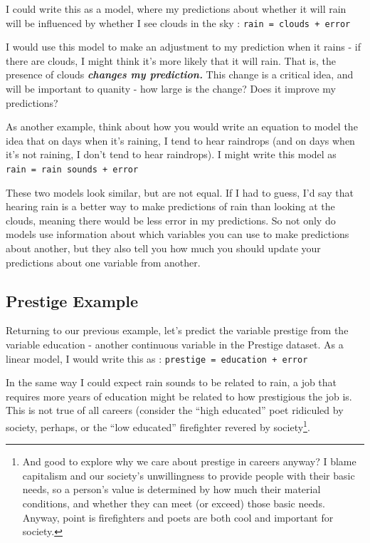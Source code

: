 \documentclass[
  letterpaper,
  DIV=11,
  numbers=noendperiod,
  oneside]{scrreprt}
\begin{document}
I could write this as a model, where my predictions about whether it
will rain will be influenced by whether I see clouds in the sky :
\texttt{rain\ =\ clouds\ +\ error}

I would use this model to make an adjustment to my prediction when it
rains - if there are clouds, I might think it's more likely that it will
rain. That is, the presence of clouds \textbf{\emph{changes my
prediction.}} This change is a critical idea, and will be important to
quanity - how large is the change? Does it improve my predictions?

As another example, think about how you would write an equation to model
the idea that on days when it's raining, I tend to hear raindrops (and
on days when it's not raining, I don't tend to hear raindrops). I might
write this model as \texttt{rain\ =\ rain\ sounds\ +\ error}

These two models look similar, but are not equal. If I had to guess, I'd
say that hearing rain is a better way to make predictions of rain than
looking at the clouds, meaning there would be less error in my
predictions. So not only do models use information about which variables
you can use to make predictions about another, but they also tell you
how much you should update your predictions about one variable from
another.

\subsection{\texorpdfstring{\textbf{Prestige
Example}}{Prestige Example}}\label{prestige-example}

Returning to our previous example, let's predict the variable prestige
from the variable education - another continuous variable in the
Prestige dataset. As a linear model, I would write this as :
\texttt{prestige\ =\ education\ +\ error}

In the same way I could expect rain sounds to be related to rain, a job
that requires more years of education might be related to how
prestigious the job is. This is not true of all careers (consider the
``high educated'' poet ridiculed by society, perhaps, or the ``low
educated'' firefighter revered by society\footnote{And good to explore
  why we care about prestige in careers anyway? I blame capitalism and
  our society's unwillingness to provide people with their basic needs,
  so a person's value is determined by how much their material
  conditions, and whether they can meet (or exceed) those basic needs.
  Anyway, point is firefighters and poets are both cool and important
  for society.}.
\end{document}
